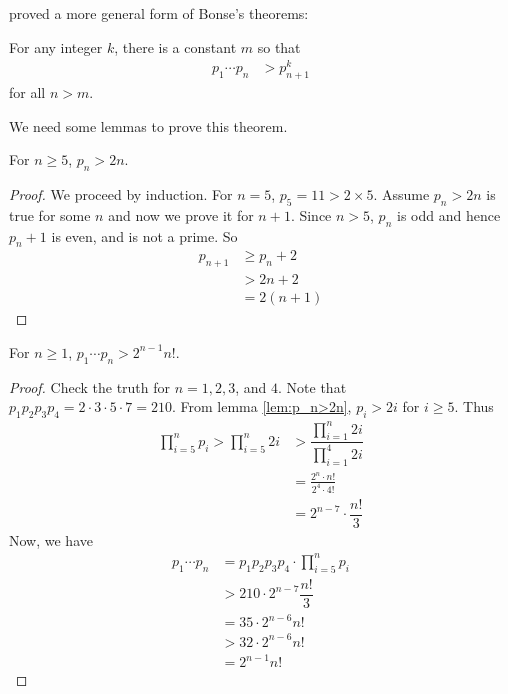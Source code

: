 \documentclass{subfiles}
\begin{document}
	\textcite{posa_1960} proved a more general form of Bonse's theorems:

	\begin{theorem}
		\label{thm:posa}
		For any integer $k$, there is a constant $m$ so that
			\begin{align*}
				p_1\cdots p_n
					& >p_{n+1}^k
			\end{align*}
		for all $n>m$.
	\end{theorem}

	We need some lemmas to prove this theorem.

	\begin{lemma}
		For $n\geq 5$, $p_n>2n$.\label{lem:p_n>2n}
	\end{lemma}

	\begin{proof}
		We proceed by induction. For $n=5$, $p_5=11>2 \times 5$. Assume $p_n >2n$ is true for some $n$ and now we prove it for $n+1$. Since $n>5$, $p_n$ is odd and hence $p_n+1$ is even, and is not a prime. So
			\begin{align*}
				p_{n+1}
					& \geq p_n+2\\
					& >2n+2\\
					& =2(n+1)
			\end{align*}
	\end{proof}

	\begin{lemma}
		For $n\geq1$, $p_1\cdots p_n> 2^{n-1}n!$.\label{lem:p_1p_2...p_n>2^{n-1}n!}
	\end{lemma}

	\begin{proof}
		Check the truth for $n=1,2,3$, and $4$. Note that $p_1p_2p_3p_4=2\cdot3\cdot5\cdot7=210$. From lemma \eqref{lem:p_n>2n}, $p_i>2i$ for $i\geq5$. Thus
			\begin{align*}
				\prod_{i=5}^np_i > \prod_{i=5}^n2i & > \dfrac{\prod_{i=1}^n 2i}{\prod_{i=1}^4 2i}\\
												   & = \frac{2^n \cdot n!}{2^4\cdot 4!}\\
												   & = 2^{n-7}\cdot \dfrac{n!}{3}
			\end{align*}
		Now, we have
			\begin{align*}
				p_1\cdots p_n & = p_1p_2p_3p_4\cdot \prod_{i=5}^np_i \\
						   	  & > 210\cdot2^{n-7}\dfrac{n!}{3}\\
							  & = 35 \cdot2^{n-6}n!\\
							  & > 32 \cdot 2^{n-6}n!\\
							  & = 2^{n-1}n!
			\end{align*}
	\end{proof}
\end{document}
